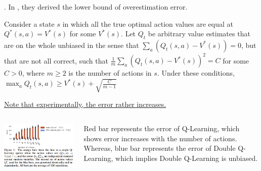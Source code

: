 \documentclass[8pt]{beamer}
\begin{document}
\begin{frame}{.}
    In \cite{van2016deep}, they derived the lower bound of overestimation error.

    \begin{theorem}
        Consider a state $s$ in which all the true optimal action values are equal at $Q^\ast (s,a) = V^\ast (s)$ for some $V^\ast(s)$.
        Let $Q_t$ be arbitrary value estimates that are on the whole unbiased in the sense that $\sum_a (Q_t(s,a) - V^\ast(s)) = 0$, but that are not all correct, such that $\frac{1}{m} \sum_a (Q_t(s,a) - V^\ast(s))^2 = C$ for some $C>0$, where $m  \geq 2$ is the number of actions in $s$.
        Under these conditions, $\max_{a} Q_t(s,a) \geq V^\ast(s) + \sqrt{\frac{C}{m-1}}$
    \end{theorem}

    \bigskip
    \underline{Note that experimentally, the error rather increases.}

    \begin{columns}
        \begin{column}{0.6\textwidth}
            \includegraphics[width=1.0\textwidth]{IncreasingErrorwithNumActions.png}
        \end{column}
        \begin{column}{0.4\textwidth}
            Red bar represents the error of Q-Learning, which shows error increases with the number of actions. Whereas, blue bar represents the error of Double Q-Learning, which implies Double Q-Learning is unbiased.
        \end{column}
    \end{columns}
\end{frame}
\end{document}
